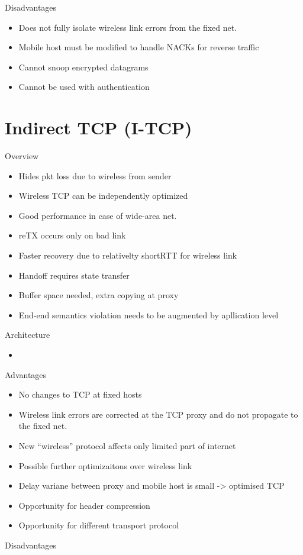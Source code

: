 \documentclass[a4paper]{article}
\begin{document}
Disadvantages
\begin{itemize}
	\item Does not fully isolate wireless link errors from the fixed net.
	\item Mobile host must be modified to handle NACKs for reverse traffic
	\item Cannot snoop encrypted datagrams
	\item Cannot be used with authentication
\end{itemize}
\section{Indirect TCP (I-TCP)}
Overview
\begin{itemize}
	\item Hides pkt loss due to wireless from sender
	\item Wireless TCP can be independently optimized
	\item Good performance in case of wide-area net.
	\item reTX occurs only on bad link
	\item Faster recovery due to relativelty shortRTT for wireless link
	\item Handoff requires state transfer
	\item Buffer space needed, extra copying at proxy
	\item End-end semantics violation needs to be augmented by apllication
		level
\end{itemize}
Architecture
\begin{itemize}
	\item
\end{itemize}
Advantages
\begin{itemize}
	\item No changes to TCP at fixed hosts
	\item Wireless link errors are corrected at the TCP proxy and do not
		propagate to the fixed net.
	\item New ``wireless'' protocol affects only limited part of internet
	\item Possible further optimizaitons over wireless link
	\item Delay variane between proxy and mobile host is small -> optimised
		TCP
	\item Opportunity for header compression
	\item Opportunity for different transport protocol
\end{itemize}
Disadvantages
\end{document}
